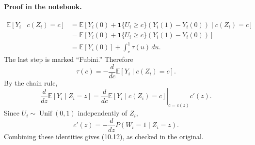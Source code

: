 \paragraph{Proof in the notebook.}
\begin{align*}
 \mathbb E[Y_i\mid c(Z_i)=c]
 &=\mathbb E[Y_i(0)+\mathbf1\{U_i\ge c\}(Y_i(1)-Y_i(0))
 \mid c(Z_i)=c]\\
 &=\mathbb E[Y_i(0)+\mathbf1\{U_i\ge c\}(Y_i(1)-Y_i(0))]\\
 &=\mathbb E[Y_i(0)]+\int_c^1\tau(u)\,du.
\end{align*}
The last step is marked ``Fubini.'' Therefore
\[
 \tau(c)=-\frac d{dc}\mathbb E[Y_i\mid c(Z_i)=c].
\]
By the chain rule,
\[
 \frac d{dz}\mathbb E[Y_i\mid Z_i=z]
 =\left.\frac d{dc}\mathbb E[Y_i\mid c(Z_i)=c]\right|_{c=c(z)}c'(z).
\]
Since $U_i\sim\operatorname{Unif}(0,1)$ independently of $Z_i$,
\[
 c'(z)=-\frac d{dz}P(W_i=1\mid Z_i=z).
\]
Combining these identities gives (10.12), as checked in the original.

